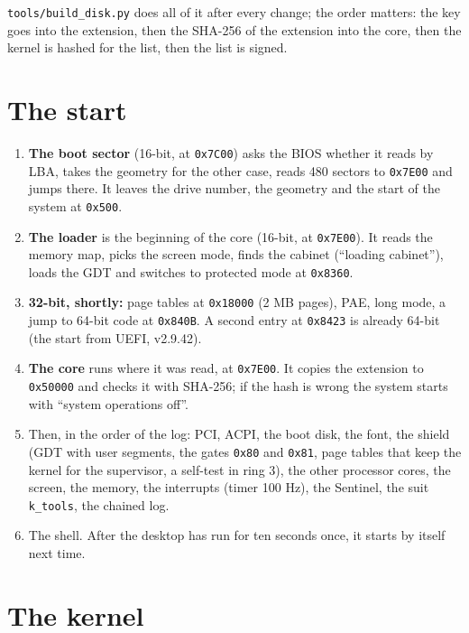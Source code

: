\documentclass[11pt,a4paper]{article}
\newcommand{\file}[1]{\texttt{#1}}
\begin{document}
\noindent \file{tools/build\_disk.py} does all of it after every change; the order matters: the
key goes into the extension, then the SHA-256 of the extension into the core, then the kernel is
hashed for the list, then the list is signed.

\section{The start}

\begin{enumerate}
\item \textbf{The boot sector} (16-bit, at \texttt{0x7C00}) asks the BIOS whether it reads by LBA,
      takes the geometry for the other case, reads 480 sectors to \texttt{0x7E00} and jumps there.
      It leaves the drive number, the geometry and the start of the system at \texttt{0x500}.
\item \textbf{The loader} is the beginning of the core (16-bit, at \texttt{0x7E00}). It reads the
      memory map, picks the screen mode, finds the cabinet (``loading cabinet''), loads the GDT and
      switches to protected mode at \texttt{0x8360}.
\item \textbf{32-bit, shortly:} page tables at \texttt{0x18000} (2 MB pages), PAE, long mode, a jump
      to 64-bit code at \texttt{0x840B}. A second entry at \texttt{0x8423} is already 64-bit (the
      start from UEFI, v2.9.42).
\item \textbf{The core} runs where it was read, at \texttt{0x7E00}. It copies the extension to
      \texttt{0x50000} and checks it with SHA-256; if the hash is wrong the system starts with
      ``system operations off''.
\item Then, in the order of the log: PCI, ACPI, the boot disk, the font, the shield (GDT with user
      segments, the gates \texttt{0x80} and \texttt{0x81}, page tables that keep the kernel for the
      supervisor, a self-test in ring 3), the other processor cores, the screen, the memory, the
      interrupts (timer 100 Hz), the Sentinel, the suit \texttt{k\_tools}, the chained log.
\item The shell. After the desktop has run for ten seconds once, it starts by itself next time.
\end{enumerate}

\section{The kernel}
\end{document}
